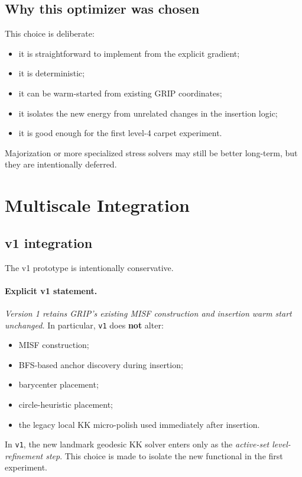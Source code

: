 \documentclass[11pt]{article}
\newcommand{\code}[1]{\begingroup\urlstyle{tt}\nolinkurl{#1}\endgroup}
\begin{document}
\subsection{Why this optimizer was chosen}

This choice is deliberate:
\begin{itemize}[leftmargin=1.4em]
  \item it is straightforward to implement from the explicit gradient;
  \item it is deterministic;
  \item it can be warm-started from existing GRIP coordinates;
  \item it isolates the new energy from unrelated changes in the insertion
    logic;
  \item it is good enough for the first level-4 carpet experiment.
\end{itemize}

Majorization or more specialized stress solvers may still be better long-term,
but they are intentionally deferred.

\section{Multiscale Integration}

\subsection{v1 integration}

The v1 prototype is intentionally conservative.

\paragraph{Explicit v1 statement.}
\emph{Version 1 retains GRIP's existing MISF construction and insertion warm
start unchanged.} In particular, \code{v1} does \textbf{not} alter:
\begin{itemize}[leftmargin=1.4em]
  \item MISF construction;
  \item BFS-based anchor discovery during insertion;
  \item barycenter placement;
  \item circle-heuristic placement;
  \item the legacy local KK micro-polish used immediately after insertion.
\end{itemize}

In \code{v1}, the new landmark geodesic KK solver enters only as the
\emph{active-set level-refinement step}. This choice is made to isolate the new
functional in the first experiment.
\end{document}
